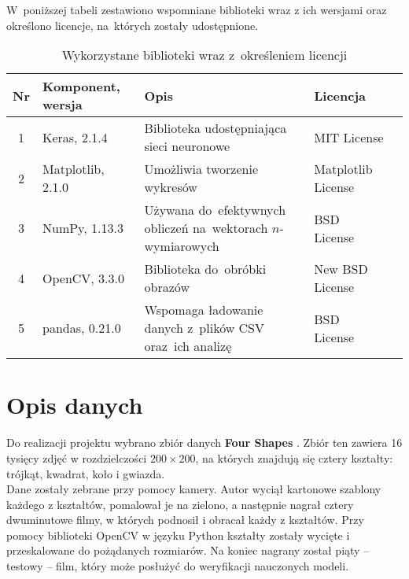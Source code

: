\documentclass[11pt,a4paper]{article}
\begin{document}
W~poniższej tabeli zestawiono wspomniane biblioteki wraz z ich wersjami oraz określono licencje, na~których zostały udostępnione.
\begin{table}[H]
    \begin{tabularx}{\textwidth}{|c|l|X|l|c|}
        \hline
        \textbf{Nr} & \textbf{Komponent, wersja} & \textbf{Opis} & \textbf{Licencja} & \\
        \hline
        \hline
        1 &
        Keras, 2.1.4 &
        Biblioteka udostępniająca sieci neuronowe &
        MIT License &
        \cite{keras} \\
        \hline
        2 & 
        Matplotlib, 2.1.0 & 
        Umożliwia tworzenie wykresów &
        Matplotlib License &
        \cite{matplotlib} \\
        \hline
        3 & 
        NumPy, 1.13.3 &
        Używana do~efektywnych obliczeń na~wektorach $n$-wymiarowych &
        BSD License &
        \cite{numpy} \\
        \hline
        4 & 
        OpenCV, 3.3.0 &
        Biblioteka do~obróbki obrazów &
        New BSD License &
        \cite{opencv} \\
        \hline
        5 &
        pandas, 0.21.0 &
        Wspomaga ładowanie danych z~plików CSV oraz~ich analizę &
        BSD License &
        \cite{pandas} \\
        \hline
    \end{tabularx}
    \caption{Wykorzystane biblioteki wraz z~określeniem licencji}
\end{table}

\section{Opis danych}

Do realizacji projektu wybrano zbiór danych \textbf{Four Shapes} \cite{shapes}. Zbiór ten zawiera 16 tysięcy zdjęć w rozdzielczości $200 \times 200$, na których znajdują się cztery kształty: trójkąt, kwadrat, koło i gwiazda.\\

Dane zostały zebrane przy pomocy kamery. Autor wyciął kartonowe szablony każdego z kształtów, pomalował je na zielono, a następnie nagrał cztery dwuminutowe filmy, w których podnosił i obracał każdy z kształtów. Przy pomocy biblioteki OpenCV w języku Python kształty zostały wycięte i przeskalowane do pożądanych rozmiarów. Na koniec nagrany został piąty -- testowy -- film, który może posłużyć do weryfikacji nauczonych modeli.\\
\end{document}
